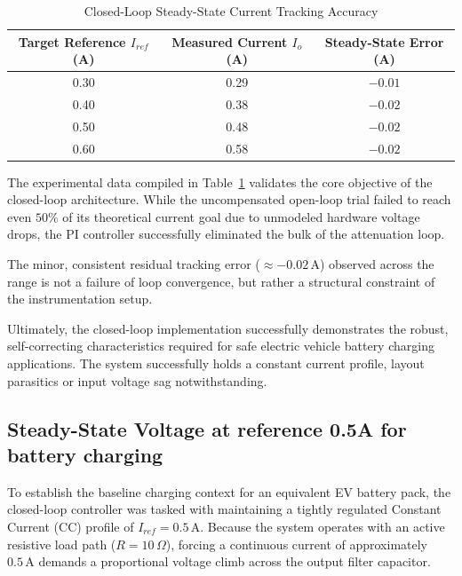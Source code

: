 \begin{table}[h!]
\centering
\caption{Closed-Loop Steady-State Current Tracking Accuracy}
\label{tab:closed_loop_results}
\begin{tabular}{ccc}
\toprule
\textbf{Target Reference $I_{ref}$ (A)} & \textbf{Measured Current $I_o$ (A)} & \textbf{Steady-State Error (A)} \\ \midrule
0.30                                    & 0.29                                & $-0.01$                         \\ 
0.40                                    & 0.38                                & $-0.02$                         \\ 
0.50                                    & 0.48                                & $-0.02$                         \\ 
0.60                                    & 0.58                                & $-0.02$                         \\ \bottomrule
\end{tabular}
\end{table}

The experimental data compiled in Table~\ref{tab:closed_loop_results} validates the core objective of the closed-loop architecture. While the uncompensated open-loop trial failed to reach even $50\%$ of its theoretical current goal due to unmodeled hardware voltage drops, the PI controller successfully eliminated the bulk of the attenuation loop.

The minor, consistent residual tracking error ($\approx -0.02\,\text{A}$) observed across the range is not a failure of loop convergence, but rather a structural constraint of the instrumentation setup.

Ultimately, the closed-loop implementation successfully demonstrates the robust, self-correcting characteristics required for safe electric vehicle battery charging applications. The system successfully holds a constant current profile, layout parasitics or input voltage sag notwithstanding.

\subsection{Steady-State Voltage at reference 0.5A for battery charging}
To establish the baseline charging context for an equivalent EV battery pack, the closed-loop controller was tasked with maintaining a tightly regulated Constant Current (CC) profile of $I_{ref} = 0.5\,\text{A}$. Because the system operates with an active resistive load path ($R = 10\,\Omega$), forcing a continuous current of approximately $0.5\,\text{A}$ demands a proportional voltage climb across the output filter capacitor.

